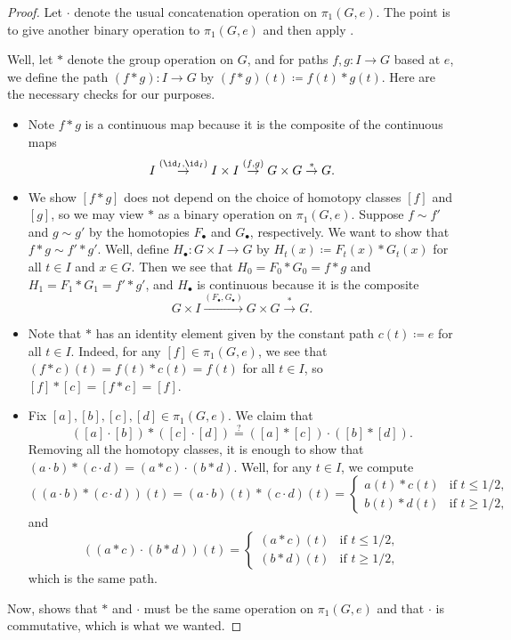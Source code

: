 \documentclass[../notes.tex]{subfiles}
\begin{document}
\begin{proof}
	Let $\cdot$ denote the usual concatenation operation on $\pi_1(G,e)$. The point is to give another binary operation to $\pi_1(G,e)$ and then apply .

	Well, let $*$ denote the group operation on $G$, and for paths $f,g\colon I\to G$ based at $e$, we define the path $(f*g)\colon I\to G$ by $(f*g)(t)\coloneqq f(t)*g(t)$. Here are the necessary checks for our purposes.
	\begin{itemize}
		\item Note $f*g$ is a continuous map because it is the composite of the continuous maps
		\[I\stackrel{(\id_I,\id_I)}\to I\times I\stackrel{(f,g)}\to G\times G\stackrel*\to G.\]
		\item We show $[f*g]$ does not depend on the choice of homotopy classes $[f]$ and $[g]$, so we may view $*$ as a binary operation on $\pi_1(G,e)$. Suppose $f\sim f'$ and $g\sim g'$ by the homotopies $F_\bullet$ and $G_\bullet$, respectively. We want to show that $f*g\sim f'*g'$. Well, define $H_\bullet\colon G\times I\to G$ by $H_t(x)\coloneqq F_t(x)*G_t(x)$ for all $t\in I$ and $x\in G$. Then we see that $H_0=F_0*G_0=f*g$ and $H_1=F_1*G_1=f'*g'$, and $H_\bullet$ is continuous because it is the composite
		\[G\times I\stackrel{(F_\bullet,G_\bullet)}\to G\times G\stackrel*\to G.\]
		\item Note that $*$ has an identity element given by the constant path $c(t)\coloneqq e$ for all $t\in I$. Indeed, for any $[f]\in\pi_1(G,e)$, we see that $(f*c)(t)=f(t)*c(t)=f(t)$ for all $t\in I$, so $[f]*[c]=[f*c]=[f]$.
		\item Fix $[a],[b],[c],[d]\in\pi_1(G,e)$. We claim that
		\[([a]\cdot[b])*([c]\cdot[d])\stackrel?=([a]*[c])\cdot([b]*[d]).\]
		Removing all the homotopy classes, it is enough to show that $(a\cdot b)*(c\cdot d)=(a*c)\cdot(b*d)$. Well, for any $t\in I$, we compute
		\[((a\cdot b)*(c\cdot d))(t)=(a\cdot b)(t)*(c\cdot d)(t)=\begin{cases}
			a(t)*c(t) & \text{if }t\le1/2, \\
			b(t)*d(t) & \text{if }t\ge1/2,
		\end{cases}\]
		and
		\[((a*c)\cdot(b*d))(t)=\begin{cases}
			(a*c)(t) & \text{if }t\le1/2, \\
			(b*d)(t) & \text{if }t\ge1/2,
		\end{cases}\]
		which is the same path.
	\end{itemize}
	Now,  shows that $*$ and $\cdot$ must be the same operation on $\pi_1(G,e)$ and that $\cdot$ is commutative, which is what we wanted.
\end{proof}
\end{document}

